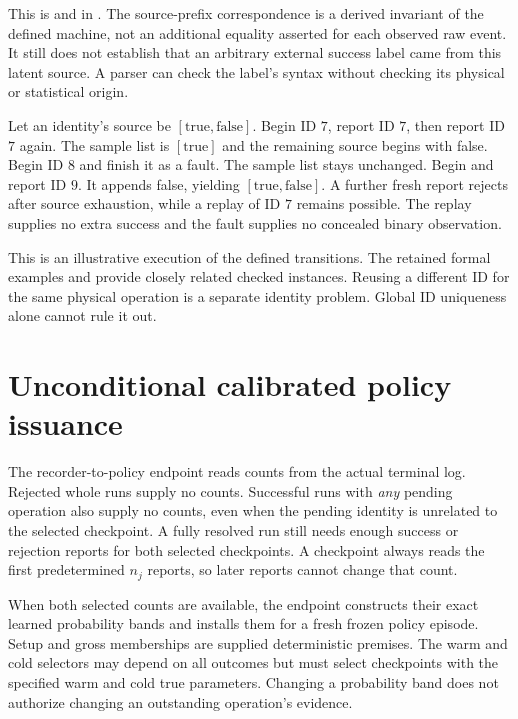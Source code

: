 This is  and  in
. The source-prefix correspondence is a
derived invariant of the defined machine, not an additional equality asserted
for each observed raw event. It still does not establish that an arbitrary
external success label came from this latent source. A parser can check the
label's syntax without checking its physical or statistical origin.

\begin{example}
Let an identity's source be $[\mathrm{true},\mathrm{false}]$. Begin ID $7$, report
ID $7$, then report ID $7$ again. The sample list is $[\mathrm{true}]$ and the
remaining source begins with false. Begin ID $8$ and finish it as a fault. The
sample list stays unchanged. Begin and report ID $9$. It appends false, yielding
$[\mathrm{true},\mathrm{false}]$. A further fresh report rejects after source
exhaustion, while a replay of ID $7$ remains possible. The replay supplies no
extra success and the fault supplies no concealed binary observation.
\end{example}

This is an illustrative execution of the defined transitions. The retained
formal examples  and
 provide closely related checked
instances. Reusing a different ID for the same physical operation is a separate
identity problem. Global ID uniqueness alone cannot rule it out.

\section{Unconditional calibrated policy issuance}
\label{sec:issuance}

The recorder-to-policy endpoint reads counts from the actual terminal log.
Rejected whole runs supply no counts. Successful runs with \emph{any} pending
operation also supply no counts, even when the pending identity is unrelated to
the selected checkpoint. A fully resolved run still needs enough success or
rejection reports for both selected checkpoints. A checkpoint always reads the
first predetermined $n_j$ reports, so later reports cannot change that count.

When both selected counts are available, the endpoint constructs their exact
learned probability bands and installs them for a fresh frozen policy episode.
Setup and gross memberships are supplied deterministic premises. The warm and
cold selectors may depend on all outcomes but must select checkpoints with the
specified warm and cold true parameters. Changing a probability band does not
authorize changing an outstanding operation's evidence.

